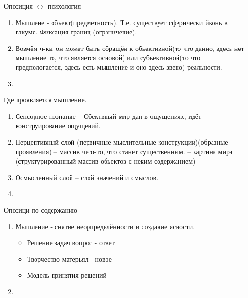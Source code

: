 \documentclass[a4paper,12pt]{article}
\begin{document}
    Опозиция $\leftrightarrow$ психология

    \begin{enumerate}
        \item Мышлене - объект(предметность). Т.е. существует сферически йконь в вакуме. Фиксация границ (ограничение).
        \item Возмём ч-ка, он может быть обращён к объективной(то что данно, здесь нет мышление то, что является основой) или субьективной(то что предпологается, здесь есть мышление и оно здесь звено) реальности.
        \item 
    \end{enumerate}
    Где проявляется мышление.
    \begin{enumerate}
        \item Сенсорное познание -- Обектвный мир дан в ощущениях, идёт конструирование ощущений.
        \item Перцептивный слой (первичные мыслительные конструкции)(образные проявления) -- массив чего-то, что станет существенным. -- картина мира (структурированный массив обьектов с неким содержанием)
        \item Осмысленный слой -- слой значений и смыслов.
        \item 
    \end{enumerate}
    Опозици по содержанию
    \begin{enumerate}
        \item Мышление - снятие неорпределённости и создание ясности. 
        \begin{itemize}
            \item Решение задач вопрос - ответ
            \item Творчество матерьял - новое
            \item Модель принятия решений
        \end{itemize}
        \item 
    \end{enumerate}
\end{document}
